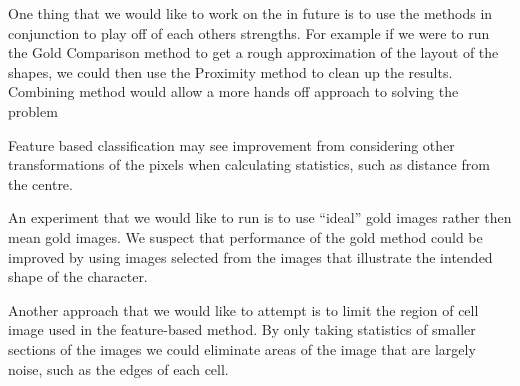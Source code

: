 
One thing that we would like to work on the in future is to use the methods in
conjunction to play off of each others strengths. For example if we were to run
the Gold Comparison method to get a rough approximation of the layout of the
shapes, we could then use the Proximity method to clean up the results.
Combining method would allow a more hands off approach to solving the problem

Feature based classification may see improvement from considering other
transformations of the pixels when calculating statistics, such as distance
from the centre.

An experiment that we would like to run is to use ``ideal'' gold images rather
then mean gold images. We suspect that performance of the gold method could be
improved by using images selected from the images that illustrate the intended
shape of the character.

Another approach that we would like to attempt is to limit the region of cell
image used in the feature-based method. By only taking statistics of smaller
sections of the images we could eliminate areas of the image that are largely
noise, such as the edges of each cell.

